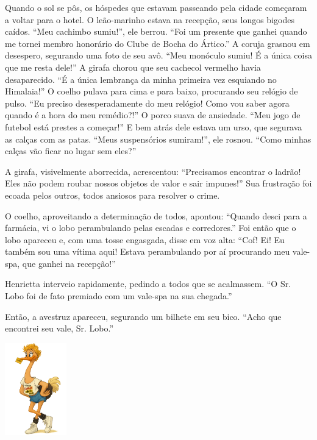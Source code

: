 Quando o sol se pôs, os hóspedes que estavam passeando pela cidade começaram a voltar para o hotel. O leão-marinho estava na recepção, seus longos bigodes caídos. ``Meu cachimbo sumiu!'', ele berrou. ``Foi um presente que ganhei quando me tornei membro honorário do Clube de Bocha do Ártico.'' A coruja grasnou em desespero, segurando uma foto de seu avô. ``Meu monóculo sumiu! É a única coisa que me resta dele!'' A girafa chorou que seu cachecol vermelho havia desaparecido. ``É a única lembrança da minha primeira vez esquiando no Himalaia!'' O coelho pulava para cima e para baixo, procurando seu relógio de pulso. ``Eu preciso desesperadamente do meu relógio! Como vou saber agora quando é a hora do meu remédio?!'' O porco suava de ansiedade. ``Meu jogo de futebol está prestes a começar!'' E bem atrás dele estava um urso, que segurava as calças com as patas. ``Meus suspensórios sumiram!'', ele rosnou. ``Como minhas calças vão ficar no lugar sem eles?''

A girafa, visivelmente aborrecida, acrescentou: ``Precisamos encontrar o ladrão! Eles não podem roubar nossos objetos de valor e sair impunes!'' Sua frustração foi ecoada pelos outros, todos ansiosos para resolver o crime.

O coelho, aproveitando a determinação de todos, apontou: ``Quando desci para a farmácia, vi o lobo perambulando pelas escadas e corredores.'' Foi então que o lobo apareceu e, com uma tosse engasgada, disse em voz alta: ``Cof! Ei! Eu também sou uma vítima aqui! Estava perambulando por aí procurando meu vale-spa, que ganhei na recepção!''

Henrietta interveio rapidamente, pedindo a todos que se acalmassem. ``O Sr. Lobo foi de fato premiado com um vale-spa na sua chegada.''

Então, a avestruz apareceu, segurando um bilhete em seu bico. ``Acho que encontrei seu vale, Sr. Lobo.''

\begin{center}
\includegraphics[width=0.2\textwidth]{images/ostrich.png}
\end{center}

